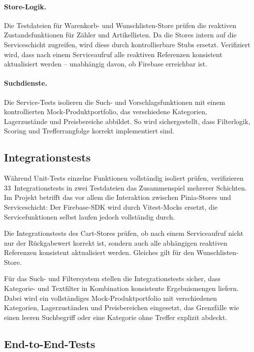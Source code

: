 \paragraph{Store-Logik.} Die Testdateien für Warenkorb- und Wunschlisten-Store prüfen die reaktiven Zustandsfunktionen für Zähler und Artikellisten. Da die Stores intern auf die Serviceschicht zugreifen, wird diese durch kontrollierbare Stubs ersetzt. Verifiziert wird, dass nach einem Serviceaufruf alle reaktiven Referenzen konsistent aktualisiert werden -- unabhängig davon, ob Firebase erreichbar ist.

\paragraph{Suchdienste.} Die Service-Tests isolieren die Such- und Vorschlagsfunktionen mit einem kontrollierten Mock-Produktportfolio, das verschiedene Kategorien, Lagerzustände und Preisbereiche abbildet. So wird sichergestellt, dass Filterlogik, Scoring und Trefferrangfolge korrekt implementiert sind.

\subsection{Integrationstests}
\label{sec:integration-tests}

Während Unit-Tests einzelne Funktionen vollständig isoliert prüfen, verifizieren 33~Integrationstests in zwei Testdateien das Zusammenspiel mehrerer Schichten. Im Projekt betrifft das vor allem die Interaktion zwischen Pinia-Stores und Serviceschicht: Der Firebase-SDK wird durch Vitest-Mocks ersetzt, die Servicefunktionen selbst laufen jedoch vollständig durch.

Die Integrationstests des Cart-Stores prüfen, ob nach einem Serviceaufruf nicht nur der Rückgabewert korrekt ist, sondern auch alle abhängigen reaktiven Referenzen konsistent aktualisiert werden. Gleiches gilt für den Wunschlisten-Store.

Für das Such- und Filtersystem stellen die Integrationstests sicher, dass Kategorie- und Textfilter in Kombination konsistente Ergebnismengen liefern. Dabei wird ein vollständiges Mock-Produktportfolio mit verschiedenen Kategorien, Lagerzuständen und Preisbereichen eingesetzt, das Grenzfälle wie einen leeren Suchbegriff oder eine Kategorie ohne Treffer explizit abdeckt.

\subsection{End-to-End-Tests}
\label{sec:e2e-tests}

